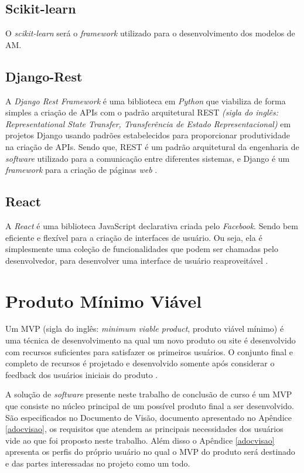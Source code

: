 \subsection{Scikit-learn}
O \textit{scikit-learn} será o \textit{framework} utilizado para o desenvolvimento dos modelos de AM.
\subsection{Django-Rest}

A \textit{Django Rest Framework} é uma biblioteca em \textit{Python} que viabiliza de forma simples a criação de APIs com o padrão arquitetural REST \textit{(sigla do inglês: Representational State Transfer, Transferência de Estado Representacional)} em projetos Django usando padrões estabelecidos para proporcionar produtividade na criação de APIs. Sendo que, REST é um padrão arquitetural da engenharia de \textit{software} utilizado para a comunicação entre diferentes sistemas, e Django é um \textit{framework} para a criação de páginas \textit{web} \cite{christie2011django}.

\subsection{React}

A \textit{React} é uma biblioteca JavaScript declarativa criada pelo \textit{Facebook}. Sendo bem eficiente e flexível para a criação de interfaces de usuário. Ou seja, ela é simplesmente uma coleção de funcionalidades que podem ser chamadas pelo desenvolvedor, para desenvolver uma interface de usuário reaproveitável \cite{reactjs}.

\section{Produto Mínimo Viável}

Um MVP (sigla do inglês: \textit{minimum viable product}, produto viável mínimo) é uma técnica de desenvolvimento na qual um novo produto ou site é desenvolvido com recursos suficientes para satisfazer os primeiros usuários. O conjunto final e completo de recursos é projetado e desenvolvido somente após considerar o feedback dos usuários iniciais do produto \cite{MVP}.

A solução de \textit{software} presente neste trabalho de conclusão de curso é um MVP que consiste no núcleo principal de um possível produto final a ser desenvolvido. São especificados no Documento de Visão, documento apresentado no Apêndice \ref{adocvisao}, os requisitos que atendem as principais necessidades dos usuários vide ao que foi proposto neste trabalho. Além disso o Apêndice \ref{adocvisao} apresenta os perfis do próprio usuário no qual o MVP do produto será destinado e das partes interessadas no projeto como um todo.
